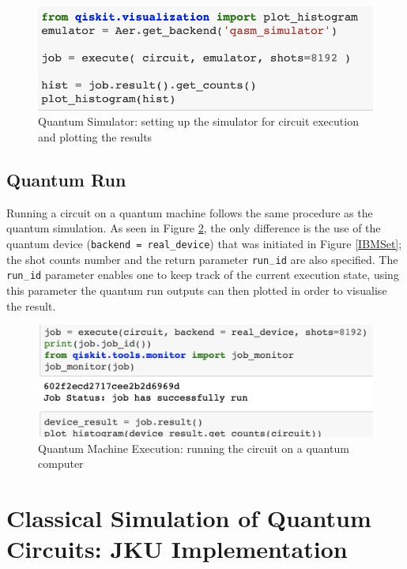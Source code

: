 \begin{figure}[H]
      \centering
      \includegraphics[scale=0.4]{background/QExSim.png}
      \caption{Quantum Simulator: setting up the simulator for circuit execution and plotting the results}
      \label{QSim}
\end{figure}
 


\subsection{Quantum Run}

Running a circuit on a quantum machine follows the same procedure as the quantum simulation. As seen in Figure \ref{QRun}, the only difference is the use of the quantum device (\texttt{backend = real\_device}) that was initiated in Figure \ref{IBMSet}; the shot counts number and the return parameter \texttt{run$_-$id} are also specified. The \texttt{run$_-$id} parameter enables one to keep track of the current execution state, using this parameter the quantum run outputs can then plotted in order to visualise the result.

\begin{figure}[H]
      \centering
      \includegraphics[scale=0.7]{background/QRun.png}
      \caption{Quantum Machine Execution: running the circuit on a quantum computer }
      \label{QRun}
\end{figure}

\section{Classical Simulation of Quantum Circuits: JKU Implementation }

